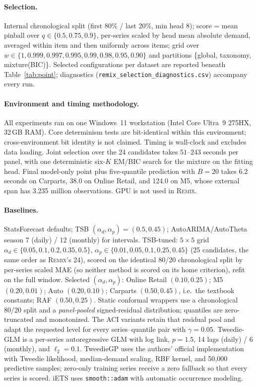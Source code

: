\documentclass[twocolumn,10pt]{article}
\theoremstyle{definition}
\newcommand{\REMIX}{\textsc{Remix}}
\begin{document}
\paragraph{Selection.} Internal chronological split (first 80\% / last
20\%, min head 8); score = mean pinball over $q\in\{0.5,0.75,0.9\}$,
per-series scaled by head mean absolute demand, averaged within item and then
uniformly across items; grid over
$w\in\{1,0.999,0.997,0.995,0.99,0.98,0.95,0.90\}$ and partitions
\{global, taxonomy, mixture(BIC)\}. Selected configurations per dataset
are reported beneath Table~\ref{tab:point}; diagnostics
(\texttt{remix\_selection\_diagnostics.csv}) accompany every run.

\paragraph{Environment and timing methodology.} All experiments ran on one
Windows~11 workstation (Intel Core Ultra~9 275HX, 32\,GB RAM). Core
determinism tests are bit-identical within this environment;
cross-environment bit identity is not claimed. Timing is wall-clock and
excludes data loading. Joint selection over the 24 candidates takes
$51$--$243$ seconds per panel, with one deterministic six-$K$ EM/BIC
search for the mixture on the fitting head. Final model-only point plus
five-quantile prediction with $B=20$ takes 6.2 seconds on
Carparts, 38.0 on Online Retail, and 124.0 on M5, whose
external span has 3.235 million observations. GPU is not used in \REMIX{}.

\paragraph{Baselines.} StatsForecast defaults; TSB
$(\alpha_d,\alpha_p)=(0.5,0.45)$; AutoARIMA/AutoTheta season 7 (daily) /
12 (monthly) for intervals. TSB-tuned: $5\times5$ grid
$\alpha_d\in\{0.05,0.1,0.2,0.35,0.5\}$,
$\alpha_p\in\{0.01,0.05,0.1,0.25,0.45\}$ (25 candidates, the same order
as \REMIX{}'s 24), scored on the identical 80/20 chronological split by
per-series scaled MAE (so neither method is scored on its home
criterion), refit on the full window. Selected $(\alpha_d,\alpha_p)$:
Online Retail $(0.10,0.25)$; M5 $(0.20,0.01)$; Auto $(0.20,0.10)$;
Carparts $(0.50,0.45)$, i.e.\ the textbook constants; RAF
$(0.50,0.25)$. Static conformal wrappers use a chronological 80/20 split
and a \emph{panel-pooled} signed-residual distribution; quantiles are
zero-truncated and monotonized. The ACI variants retain that residual
pool and adapt the requested level for every series--quantile pair with
$\gamma=0.05$. Tweedie-GLM is a per-series autoregressive GLM with log
link, $p{=}1.5$, 14 lags (daily) / 6 (monthly), and $\ell_2{=}0.1$.
TweedieGP uses the authors' official implementation with Tweedie
likelihood, median-demand scaling, RBF kernel, and 50{,}000 predictive
samples; zero-only training series receive a zero fallback so that every
series is scored. iETS uses \texttt{smooth::adam} with automatic
occurrence modeling.
\end{document}
